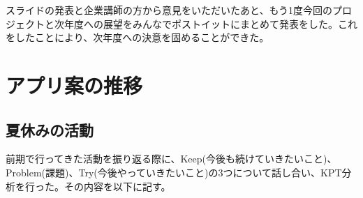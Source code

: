 \documentclass[openany,11pt,papersize]{jsbook}
\begin{document}
スライドの発表と企業講師の方から意見をいただいたあと、もう1度今回のプロジェクトと次年度への展望をみんなでポストイットにまとめて発表をした。これをしたことにより、次年度への決意を固めることができた。

\section{アプリ案の推移}

\subsection{夏休みの活動}
\par
前期で行ってきた活動を振り返る際に、Keep(今後も続けていきたいこと)、Problem(課題)、Try(今後やっていきたいこと)の3つについて話し合い、KPT分析を行った。その内容を以下に記す。
\end{document}
